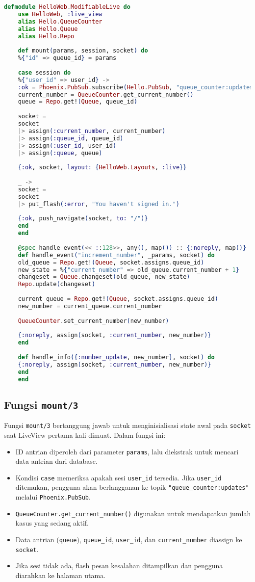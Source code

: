 \begin{lstlisting}[language=Elixir]
	defmodule HelloWeb.ModifiableLive do
	use HelloWeb, :live_view
	alias Hello.QueueCounter
	alias Hello.Queue
	alias Hello.Repo
	
	def mount(params, session, socket) do
	%{"id" => queue_id} = params
	
	case session do
	%{"user_id" => user_id} ->
	:ok = Phoenix.PubSub.subscribe(Hello.PubSub, "queue_counter:updates")
	current_number = QueueCounter.get_current_number()
	queue = Repo.get!(Queue, queue_id)
	
	socket =
	socket
	|> assign(:current_number, current_number)
	|> assign(:queue_id, queue_id)
	|> assign(:user_id, user_id)
	|> assign(:queue, queue)
	
	{:ok, socket, layout: {HelloWeb.Layouts, :live}}
	
	_ ->
	socket =
	socket
	|> put_flash(:error, "You haven't signed in.")
	
	{:ok, push_navigate(socket, to: "/")}
	end
	end
	
	@spec handle_event(<<_::128>>, any(), map()) :: {:noreply, map()}
	def handle_event("increment_number", _params, socket) do
	old_queue = Repo.get!(Queue, socket.assigns.queue_id)
	new_state = %{"current_number" => old_queue.current_number + 1}
	changeset = Queue.changeset(old_queue, new_state)
	Repo.update(changeset)
	
	current_queue = Repo.get!(Queue, socket.assigns.queue_id)
	new_number = current_queue.current_number
	
	QueueCounter.set_current_number(new_number)
	
	{:noreply, assign(socket, :current_number, new_number)}
	end
	
	def handle_info({:number_update, new_number}, socket) do
	{:noreply, assign(socket, :current_number, new_number)}
	end
	end
\end{lstlisting}

\subsection{Fungsi \texttt{mount/3}}
Fungsi \texttt{mount/3} bertanggung jawab untuk menginisialisasi state awal pada \texttt{socket} saat LiveView pertama kali dimuat. Dalam fungsi ini:
\begin{itemize}
	\item ID antrian diperoleh dari parameter \texttt{params}, lalu diekstrak untuk mencari data antrian dari database.
	\item Kondisi \texttt{case} memeriksa apakah sesi \texttt{user\_id} tersedia. Jika \texttt{user\_id} ditemukan, pengguna akan berlangganan ke topik \texttt{"queue\_counter:updates"} melalui \texttt{Phoenix.PubSub}.
	\item \texttt{QueueCounter.get\_current\_number()} digunakan untuk mendapatkan jumlah kasus yang sedang aktif.
	\item Data antrian (\texttt{queue}), \texttt{queue\_id}, \texttt{user\_id}, dan \texttt{current\_number} diassign ke \texttt{socket}.
	\item Jika sesi tidak ada, flash pesan kesalahan ditampilkan dan pengguna diarahkan ke halaman utama.
\end{itemize}

